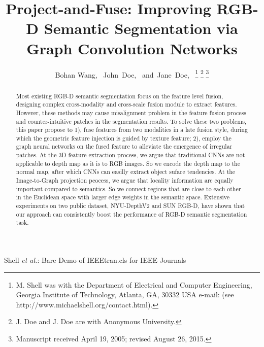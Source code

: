 \documentclass[journal]{IEEEtran}
\begin{document}


\title{Project-and-Fuse: Improving RGB-D Semantic Segmentation via Graph Convolution Networks}

\author{Bohan Wang,~
        John~Doe,~
        and~Jane~Doe,~%
\thanks{M. Shell was with the Department
of Electrical and Computer Engineering, Georgia Institute of Technology, Atlanta,
GA, 30332 USA e-mail: (see http://www.michaelshell.org/contact.html).}%
\thanks{J. Doe and J. Doe are with Anonymous University.}%
\thanks{Manuscript received April 19, 2005; revised August 26, 2015.}}

%
{Shell \MakeLowercase{\textit{et al.}}: Bare Demo of IEEEtran.cls for IEEE Journals}

\maketitle

\begin{abstract}
    Most existing RGB-D semantic segmentation focus on the feature level fusion, designing complex cross-modality and cross-scale fusion module to extract features. However, these methods may cause misalignment problem in the feature fusion process and counter-intuitive patches in the segmentation results. To solve these two problems, this paper propose to 1), fuse features from two modalities in a late fusion style, during which the geometric feature injection is guided by texture feature; 2), employ the graph neural networks on the fused feature to alleviate the emergence of irregular patches. At the 3D feature extraction process, we argue that traditional CNNs are not applicable to depth map as it is to RGB images. So we encode the depth map to the normal map, after which CNNs can easilly extract object suface tendencies. At the Image-to-Graph projection peocess, we argue that locality information are equally important compared to semantics. So we connect regions that are close to each other in the Euclidean space with larger edge weights in the semantic space. Extensive experiments on two public dataset, NYU-DepthV2 and SUN RGB-D, have shown that our approach can consistently boost the performance of RGB-D semantic segmentation task.
    \end{abstract}
\end{document}
